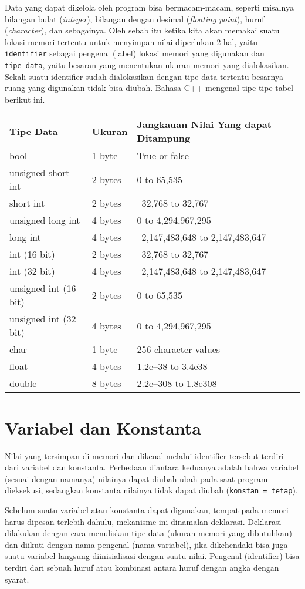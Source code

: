 Data yang dapat dikelola oleh program bisa bermacam-macam, seperti
misalnya bilangan bulat (\emph{integer}), bilangan dengan desimal
(\emph{floating point}), huruf (\emph{character}), dan sebagainya. Oleh
sebab itu ketika kita akan memakai suatu lokasi memori tertentu untuk
menyimpan nilai diperlukan 2 hal, yaitu \texttt{identifier} sebagai
pengenal (label) lokasi memori yang digunakan dan \texttt{tipe\ data},
yaitu besaran yang menentukan ukuran memori yang dialokasikan. Sekali
suatu identifier sudah dialokasikan dengan tipe data tertentu besarnya
ruang yang digunakan tidak bisa diubah. Bahasa C++ mengenal tipe-tipe
tabel berikut ini.


\begin{longtable}[]{@{}lll@{}}
\toprule
Tipe Data & Ukuran & Jangkauan Nilai Yang dapat Ditampung\tabularnewline
\midrule
\endhead
bool & 1 byte & True or false\tabularnewline
unsigned short int & 2 bytes & 0 to 65,535\tabularnewline
short int & 2 bytes & --32,768 to 32,767\tabularnewline
unsigned long int & 4 bytes & 0 to 4,294,967,295\tabularnewline
long int & 4 bytes & --2,147,483,648 to 2,147,483,647\tabularnewline
int (16 bit) & 2 bytes & --32,768 to 32,767\tabularnewline
int (32 bit) & 4 bytes & --2,147,483,648 to 2,147,483,647\tabularnewline
unsigned int (16 bit) & 2 bytes & 0 to 65,535\tabularnewline
unsigned int (32 bit) & 4 bytes & 0 to 4,294,967,295\tabularnewline
char & 1 byte & 256 character values\tabularnewline
float & 4 bytes & 1.2e--38 to 3.4e38\tabularnewline
double & 8 bytes & 2.2e--308 to 1.8e308\tabularnewline
\bottomrule

\end{longtable}


\section{Variabel dan Konstanta}\label{variabel-dan-konstanta}

Nilai yang tersimpan di memori dan dikenal melalui identifier tersebut
terdiri dari variabel dan konstanta. Perbedaan diantara keduanya adalah
bahwa variabel (sesuai dengan namanya) nilainya dapat diubah-ubah pada
saat program dieksekusi, sedangkan konstanta nilainya tidak dapat diubah
(\texttt{konstan\ =\ tetap}).

Sebelum suatu variabel atau konstanta dapat digunakan, tempat pada
memori harus dipesan terlebih dahulu, mekanisme ini dinamalan deklarasi.
Deklarasi dilakukan dengan cara menuliskan tipe data (ukuran memori yang
dibutuhkan) dan diikuti dengan nama pengenal (nama variabel), jika
dikehendaki bisa juga suatu variabel langsung diinisialisasi dengan
suatu nilai. Pengenal (identifier) bisa terdiri dari sebuah huruf atau
kombinasi antara huruf dengan angka dengan syarat.

